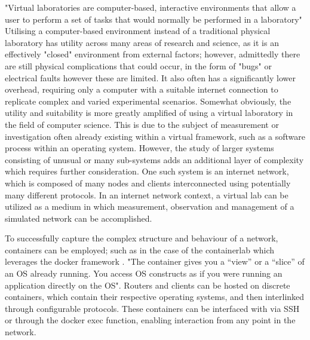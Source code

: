 "Virtual laboratories are computer-based, interactive environments that allow a user to perform a set of tasks that would normally be performed in a laboratory" \cite{india_virtual}
Utilising a computer-based environment instead of a traditional physical laboratory has utility across many areas of research and science, as it is an effectively "closed" environment from external factors; however, admittedly there are still physical complications that could occur, in the form of "bugs" or electrical faults however these are limited. It also often has a significantly lower overhead, requiring only a computer with a suitable internet connection to replicate complex and varied experimental scenarios. Somewhat obviously, the utility and suitability is more greatly amplified of using a virtual laboratory in the field of computer science. This is due to the subject of measurement or investigation often already existing within a virtual framework, such as a software process within an operating system. However, the study of larger systems consisting of unusual or many sub-systems adds an additional layer of complexity which requires further consideration. One such system is an internet network, which is composed of many nodes and clients interconnected using potentially many different protocols. In an internet network context, a virtual lab can be utilized as a medium in which measurement, observation and management of a simulated network can be accomplished. \cite{virtual_network_lab} 

To successfully capture the complex structure and behaviour of a network, containers can be employed; such as in the case of the containerlab \cite{containerlab} which leverages the docker framework \cite{docker.com}. "The container gives you a “view” or a “slice” of an OS already running. You access OS constructs as if you were running an application directly on the OS". \cite{containerization} Routers and clients can be hosted on discrete containers, which contain their respective operating systems, and then interlinked through configurable protocols. These containers can be interfaced with via SSH or through the docker exec function, enabling interaction from any point in the network. 

